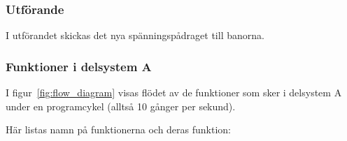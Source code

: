     \subsubsection{Utförande}

    I utförandet skickas det nya spänningspådraget till banorna. 
	
    \subsubsection{Funktioner i delsystem A} \label{sec:system_a_funcs}

    I figur~\ref{fig:flow_diagram} visas flödet av de funktioner som sker i
    delsystem A under en programcykel (alltså 10 gånger per sekund).

    Här listas namn på funktionerna och deras funktion:

